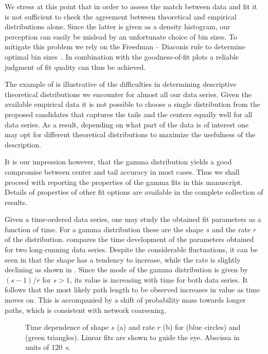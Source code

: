 		We stress at this point that in order to assess the match between data and fit it is not sufficient to check the agreement between theoretical and empirical distributions alone. Since the latter is given as a density histogram, our perception can easily be mislead by an unfortunate choice of bin sizes. To mitigate this problem we rely on the Freedman – Diaconis rule to determine optimal bin sizes~\cite{freedman1981histogram}. In combination with the goodness-of-fit plots a reliable judgment of fit quality can thus be achieved. 

		The example of  is illustrative of the difficulties in determining descriptive theoretical distributions we encounter for almost all our data series. Given the available empirical data it is not possible to choose a single distribution from the proposed candidates that captures the tails and the centers equally well for all data series. As a result, depending on what part of the data is of interest one may opt for different theoretical distributions to maximize the usefulness of the description.

		It is our impression however, that the gamma distribution yields a good compromise between center and tail accuracy in most cases. Thus we shall proceed with reporting the properties of the gamma fits in this manuscript. Details of properties of other fit options are available in the complete collection of results. 

		Given a time-ordered data series, one may study the obtained fit parameters as a function of time. For a gamma distribution these are the shape $s$ and the rate $r$ of the distribution.  compares the time development of the parameters obtained for two long-running data series. Despite the considerable fluctuations, it can be seen in  that the shape has a tendency to increase, while the rate is slightly declining as shown in . Since the mode of the gamma distribution is given by $(s-1)/r$ for $s > 1$, its value is increasing with time for both data series. It follows that the most likely path length to be observed increases in value as time moves on. This is accompanied by a shift of probability mass towards longer paths, which is consistent with network coarsening. 

		\begin{figure}
			\centering
			\qquad

			\caption[Path length distribution - Fit parameters]{Time dependence of shape $s$ (a) and rate $r$ (b) for  (blue circles) and  (green triangles). Linear fits are shown to guide the eye. Abscissa in units of \SI{120}{\second}.}
			\label{fig:path_lengths_fit_parameters}
		\end{figure}

